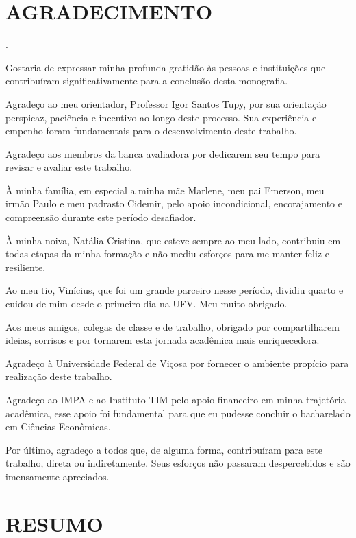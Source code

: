 \section*{AGRADECIMENTO}
\justify

\begin{invisible}
.
\end{invisible}

Gostaria de expressar minha profunda gratidão às pessoas e instituições que contribuíram significativamente para a conclusão desta monografia.

Agradeço ao meu orientador, Professor Igor Santos Tupy, por sua orientação perspicaz, paciência e incentivo ao longo deste processo. Sua experiência e empenho foram fundamentais para o desenvolvimento deste trabalho.

Agradeço aos membros da banca avaliadora por dedicarem seu tempo para revisar e avaliar este trabalho.

À minha família, em especial a minha mãe Marlene, meu pai Emerson, meu irmão Paulo e meu padrasto Cidemir, pelo apoio incondicional, encorajamento e compreensão durante este período desafiador.

À minha noiva, Natália Cristina, que esteve sempre ao meu lado, contribuiu em todas etapas da minha formação e não mediu esforços para me manter feliz e resiliente.

Ao meu tio, Vinícius, que foi um grande parceiro nesse período, dividiu quarto e cuidou de mim desde o primeiro dia na UFV. Meu muito obrigado.

Aos meus amigos, colegas de classe e de trabalho, obrigado por compartilharem ideias, sorrisos e por tornarem esta jornada acadêmica mais enriquecedora.

Agradeço à Universidade Federal de Viçosa por fornecer o ambiente propício para realização deste trabalho.

Agradeço ao IMPA e ao Instituto TIM pelo apoio financeiro em minha trajetória acadêmica, esse apoio foi fundamental para que eu pudesse concluir o bacharelado em Ciências Econômicas.

Por último, agradeço a todos que, de alguma forma, contribuíram para este trabalho, direta ou indiretamente. Seus esforços não passaram despercebidos e são imensamente apreciados.

\newpage
\pagestyle{fancy}

\section*{RESUMO}


